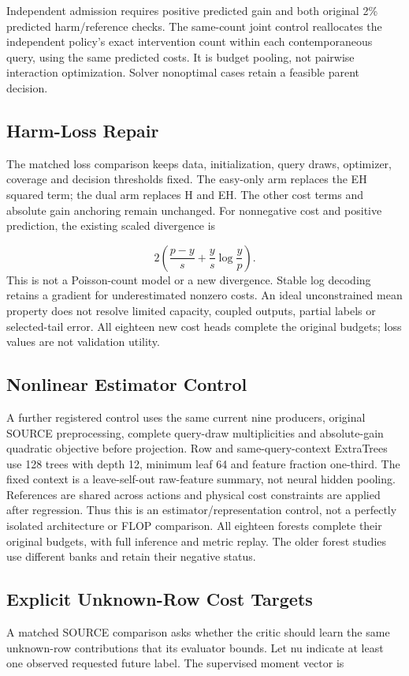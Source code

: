 \documentclass[10pt,twocolumn,letterpaper]{article}
\begin{document}
Independent admission requires positive predicted gain and both original 2\%
predicted harm/reference checks. The same-count joint control reallocates the
independent policy's exact intervention count within each contemporaneous query,
using the same predicted costs. It is budget pooling, not pairwise interaction
optimization. Solver nonoptimal cases retain a feasible parent decision.

\subsection{Harm-Loss Repair}
The matched loss comparison keeps data, initialization, query draws, optimizer,
coverage and decision thresholds fixed. The easy-only arm replaces the EH
squared term; the dual arm replaces H and EH. The other cost terms and absolute
gain anchoring remain unchanged. For nonnegative cost and positive prediction,
the existing scaled divergence is

\begin{equation}
2\left(\frac{p-y}{s}+\frac{y}{s}\log\frac{y}{p}\right).
\end{equation}
This is not a Poisson-count model or a new divergence. Stable log decoding
retains a gradient for underestimated nonzero costs. An ideal unconstrained
mean property does not resolve limited capacity, coupled outputs, partial
labels or selected-tail error. All eighteen new cost heads complete the
original budgets; loss values are not validation utility.

\subsection{Nonlinear Estimator Control}
A further registered control uses the same current nine producers, original
SOURCE preprocessing, complete query-draw multiplicities and absolute-gain
quadratic objective before projection. Row and same-query-context ExtraTrees
use 128 trees with depth 12, minimum leaf 64 and feature fraction one-third.
The fixed context is a leave-self-out raw-feature summary, not neural hidden
pooling. References are shared across actions and physical cost constraints
are applied after regression. Thus this is an estimator/representation control,
not a perfectly isolated architecture or FLOP comparison. All eighteen forests
complete their original budgets, with full inference and metric replay.
The older forest studies use different banks and retain their negative status.

\subsection{Explicit Unknown-Row Cost Targets}
A matched SOURCE comparison asks whether the critic should learn the same
unknown-row contributions that its evaluator bounds. Let nu indicate at least
one observed requested future label. The supervised moment vector is
\end{document}
